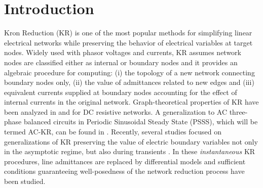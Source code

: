 \documentclass[a4paper]{article}
\theoremstyle{plain}
\begin{document}
     \newpage
     \section{Introduction}
          \label{sec:intro}
   
Kron Reduction (KR) is one of the most popular methods for simplifying linear electrical networks \cite{kron1939tensor} while preserving the behavior of electrical variables at target nodes. Widely used with phasor voltages and currents, KR assumes network nodes are classified either as internal or boundary nodes and it provides an algebraic procedure for computing: 
(i) the topology of a new network connecting boundary nodes only, (ii) the value of admittances related to new edges and (iii) equivalent currents supplied at boundary nodes  accounting for the effect of internal currents in the original network.    
Graph-theoretical properties of KR have been analyzed in \cite{van2010characterization} and \cite{dorfler2013kron} for DC resistive networks. A generalization to AC three-phase balanced circuits in Periodic Sinusoidal Steady State (PSSS), which will be termed AC-KR, can be found in \cite{caliskan2012kron}.
Recently, several studies focused on generalizations of KR preserving the value of electric boundary variables not only in the asymptotic regime, but also during transients \cite{van2010characterization, caliskan2012kron, caliskan2014towards, luo2014spatiotemporal, dhople2014synchronization}. In these \textit{instantaneous} KR procedures, line admittances are replaced by differential models and sufficient conditions guaranteeing well-posedness of the network reduction process have been studied.  
\end{document}
